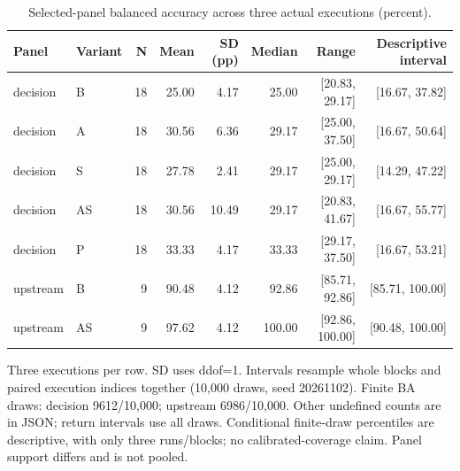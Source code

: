 \begin{table}[htbp]
\centering\small
\caption{Selected-panel balanced accuracy across three actual executions (percent).}
\label{tab:r3_variability}
\setlength{\tabcolsep}{3.5pt}
\begin{tabular}{llrrrrrr}
\hline
Panel & Variant & N & Mean & SD (pp) & Median & Range & Descriptive interval \\
\hline
decision & B & 18 & 25.00 & 4.17 & 25.00 & [20.83, 29.17] & [16.67, 37.82] \\
decision & A & 18 & 30.56 & 6.36 & 29.17 & [25.00, 37.50] & [16.67, 50.64] \\
decision & S & 18 & 27.78 & 2.41 & 29.17 & [25.00, 29.17] & [14.29, 47.22] \\
decision & AS & 18 & 30.56 & 10.49 & 29.17 & [20.83, 41.67] & [16.67, 55.77] \\
decision & P & 18 & 33.33 & 4.17 & 33.33 & [29.17, 37.50] & [16.67, 53.21] \\
upstream & B & 9 & 90.48 & 4.12 & 92.86 & [85.71, 92.86] & [85.71, 100.00] \\
upstream & AS & 9 & 97.62 & 4.12 & 100.00 & [92.86, 100.00] & [90.48, 100.00] \\
\hline
\end{tabular}
\par\smallskip\footnotesize Three executions per row. SD uses ddof=1. Intervals resample whole blocks and paired execution indices together (10,000 draws, seed 20261102). Finite BA draws: decision 9612/10,000; upstream 6986/10,000. Other undefined counts are in JSON; return intervals use all draws. Conditional finite-draw percentiles are descriptive, with only three runs/blocks; no calibrated-coverage claim. Panel support differs and is not pooled.
\end{table}
